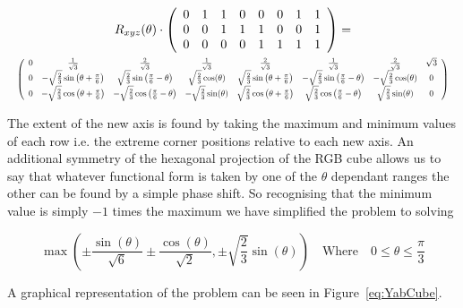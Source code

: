 \begin{multline}\label{eq:YabCube}
  R_{xyz}(\theta)\cdot\left(
\begin{array}{cccccccc}
 0 & 1 & 1 & 0 & 0 & 0 & 1 & 1 \\
 0 & 0 & 1 & 1 & 1 & 0 & 0 & 1 \\
 0 & 0 & 0 & 0 & 1 & 1 & 1 & 1 \\
\end{array}
\right) = \\
\resizebox{\textwidth}{!}{%
$\displaystyle
\left(
\begin{array}{cccccccc}
 0 & \frac{1}{\sqrt{3}} & \frac{2}{\sqrt{3}} & \frac{1}{\sqrt{3}} & \frac{2}{\sqrt{3}} & \frac{1}{\sqrt{3}} & \frac{2}{\sqrt{3}} & \sqrt{3} \\
 0 & -\sqrt{\frac{2}{3}} \sin \left(\theta +\frac{\pi }{6}\right) & \sqrt{\frac{2}{3}} \sin \left(\frac{\pi }{6}-\theta \right) & \sqrt{\frac{2}{3}} \cos (\theta ) & \sqrt{\frac{2}{3}} \sin \left(\theta +\frac{\pi }{6}\right) & -\sqrt{\frac{2}{3}} \sin \left(\frac{\pi }{6}-\theta \right) & -\sqrt{\frac{2}{3}} \cos (\theta ) & 0 \\
 0 & -\sqrt{\frac{2}{3}} \cos \left(\theta +\frac{\pi }{6}\right) & -\sqrt{\frac{2}{3}} \cos \left(\frac{\pi }{6}-\theta \right) & -\sqrt{\frac{2}{3}} \sin (\theta ) & \sqrt{\frac{2}{3}} \cos \left(\theta +\frac{\pi }{6}\right) & \sqrt{\frac{2}{3}} \cos \left(\frac{\pi }{6}-\theta \right) & \sqrt{\frac{2}{3}} \sin (\theta ) & 0 \\
\end{array}
\right)$}
\end{multline}


The extent of the new axis is found by taking the maximum and minimum values of each row i.e. the extreme corner positions relative to each new axis. An additional symmetry of the hexagonal projection of the RGB cube allows us to say that whatever functional form is taken by one of the $\theta$ dependant ranges the other can be found by a simple phase shift. So recognising that the minimum value is simply $-1$ times the maximum we have simplified the problem to solving

\begin{equation}\label{eq:AxisRangeMinMax}
 \max\left(\pm\frac{\sin (\theta )}{\sqrt{6}}\pm\frac{\cos (\theta )}{\sqrt{2}}, \pm\sqrt{\frac{2}{3}} \sin (\theta ) \right) \quad \text{Where} \quad 0\leq \theta \leq \frac{\pi}{3}
\end{equation}

A graphical representation of the problem can be seen in Figure~\ref{eq:YabCube}.

